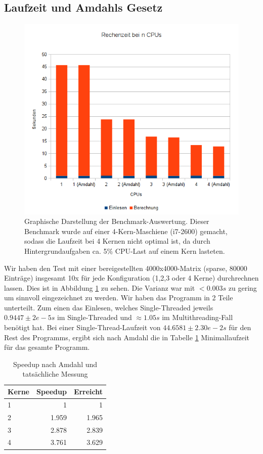\documentclass[a4paper]{scrartcl}
\begin{document}
\subsection{Laufzeit und Amdahls Gesetz}
\begin{figure}[h!]
 \centering
 \includegraphics[scale=0.75,keepaspectratio=true]{./img/CPUvsAmdahl.png}
 \caption{Graphische Darstellung der Benchmark-Auswertung. Dieser Benchmark wurde auf einer 4-Kern-Maschiene (i7-2600) gemacht, sodass die Laufzeit bei 4 Kernen nicht optimal ist, da durch Hintergrundaufgaben ca. 5\% CPU-Last auf einem Kern lasteten.}
 \label{fig:Benchmark}
\end{figure}

Wir haben den Test mit einer bereigestellten 4000x4000-Matrix (sparse, 80000 Einträge) insgesamt 10x für jede Konfiguration (1,2,3 oder 4 Kerne) durchrechnen lassen. Dies ist in Abbildung \ref{fig:Benchmark} zu sehen. Die Varianz war mit $< 0.003s$ zu gering um sinnvoll eingezeichnet zu werden. Wir haben das Programm in 2 Teile unterteilt. Zum einen das Einlesen, welches Single-Threaded jeweils $0.9447\pm2e-5 s$ im Single-Threaded und $\approx 1.05s$ im Multithreading-Fall benötigt hat. Bei einer Single-Thread-Laufzeit von $44.6581\pm2.30e-2 s$ für den Rest des Programms, ergibt sich nach Amdahl die in Tabelle \ref{tab:Amdahl} Minimallaufzeit für das gesamte Programm.

\begin{table}
\caption{Speedup nach Amdahl und tatsächliche Messung}
\centering
 \begin{tabular}[h!]{l||r|r}
  Kerne & Speedup & Erreicht \\
  \hline
  \hline
   1 & 1 & 1 \\
   2 & 1.959 & 1.965 \\
   3 & 2.878 & 2.839 \\
   4 & 3.761 & 3.629
 \end{tabular}
 \label{tab:Amdahl}
\end{table}
\end{document}
